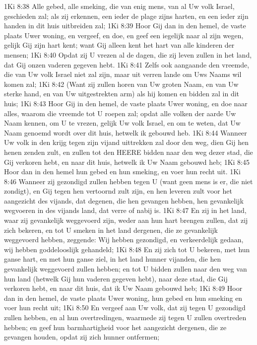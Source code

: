1Ki 8:38  Alle gebed, alle smeking, die van enig mens, van al Uw volk Israel, geschieden zal; als zij erkennen, een ieder de plage zijns harten, en een ieder zijn handen in dit huis uitbreiden zal;
1Ki 8:39  Hoor Gij dan in den hemel, de vaste plaats Uwer woning, en vergeef, en doe, en geef een iegelijk naar al zijn wegen, gelijk Gij zijn hart kent; want Gij alleen kent het hart van alle kinderen der mensen;
1Ki 8:40  Opdat zij U vrezen al de dagen, die zij leven zullen in het land, dat Gij onzen vaderen gegeven hebt.
1Ki 8:41  Zelfs ook aangaande den vreemde, die van Uw volk Israel niet zal zijn, maar uit verren lande om Uws Naams wil komen zal;
1Ki 8:42  (Want zij zullen horen van Uw groten Naam, en van Uw sterke hand, en van Uw uitgestrekten arm) als hij komen en bidden zal in dit huis;
1Ki 8:43  Hoor Gij in den hemel, de vaste plaats Uwer woning, en doe naar alles, waarom die vreemde tot U roepen zal; opdat alle volken der aarde Uw Naam kennen, om U te vrezen, gelijk Uw volk Israel, en om te weten, dat Uw Naam genoemd wordt over dit huis, hetwelk ik gebouwd heb.
1Ki 8:44  Wanneer Uw volk in den krijg tegen zijn vijand uittrekken zal door den weg, dien Gij hen henen zenden zult, en zullen tot den HEERE bidden naar den weg dezer stad, die Gij verkoren hebt, en naar dit huis, hetwelk ik Uw Naam gebouwd heb;
1Ki 8:45  Hoor dan in den hemel hun gebed en hun smeking, en voer hun recht uit.
1Ki 8:46  Wanneer zij gezondigd zullen hebben tegen U (want geen mens is er, die niet zondigt), en Gij tegen hen vertoornd zult zijn, en hen leveren zult voor het aangezicht des vijands, dat degenen, die hen gevangen hebben, hen gevankelijk wegvoeren in des vijands land, dat verre of nabij is.
1Ki 8:47  En zij in het land, waar zij gevankelijk weggevoerd zijn, weder aan hun hart brengen zullen, dat zij zich bekeren, en tot U smeken in het land dergenen, die ze gevankelijk weggevoerd hebben, zeggende: Wij hebben gezondigd, en verkeerdelijk gedaan, wij hebben goddelooslijk gehandeld;
1Ki 8:48  En zij zich tot U bekeren, met hun ganse hart, en met hun ganse ziel, in het land hunner vijanden, die hen gevankelijk weggevoerd zullen hebben; en tot U bidden zullen naar den weg van hun land (hetwelk Gij hun vaderen gegeven hebt), naar deze stad, die Gij verkoren hebt, en naar dit huis, dat ik Uw Naam gebouwd heb;
1Ki 8:49  Hoor dan in den hemel, de vaste plaats Uwer woning, hun gebed en hun smeking en voer hun recht uit;
1Ki 8:50  En vergeef aan Uw volk, dat zij tegen U gezondigd zullen hebben, en al hun overtredingen, waarmede zij tegen U zullen overtreden hebben; en geef hun barmhartigheid voor het aangezicht dergenen, die ze gevangen houden, opdat zij zich hunner ontfermen;
